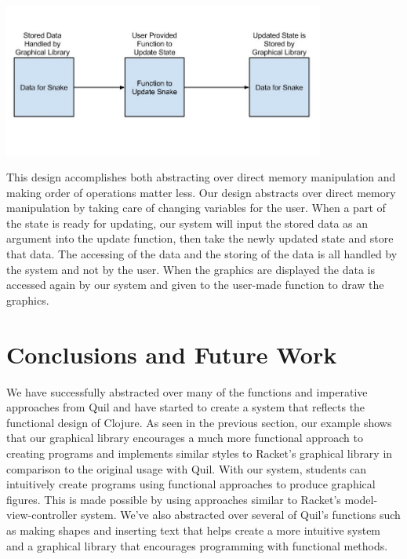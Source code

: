 \documentclass[12pt]{article}
\newcommand{\comment}[1]{}
\newcommand{\emcomment}[1]{\textcolor{ForestGreen}{\comment{Elena: {#1}}}}
\begin{document}
\begin{center}
\includegraphics[width=300pt]{Handling_State_in_Graphical_Library}
\end{center}
 
This design accomplishes both abstracting over direct memory manipulation and making order of operations matter less. Our design abstracts over direct memory manipulation by taking care of changing variables for the user. When a part of the state is ready for updating, our system will input the stored data as an argument into the update function, then take the newly updated state and store that data. The accessing of the data and the storing of the data is all handled by the system and not by the user. When the graphics are displayed the data is accessed again by our system and given to the user-made function to draw the graphics.

\section{Conclusions and Future Work}\label{sec:future-work}
We have successfully abstracted over many of the functions and imperative approaches from Quil and have started to create a system that reflects the functional design of Clojure. As seen in the previous section, our example shows that our graphical library encourages a much more functional approach to creating programs and implements similar styles to Racket's graphical library in comparison to the original usage with Quil. With our system, students can intuitively create programs using functional approaches to produce graphical figures. This is made possible by using approaches similar to Racket's model-view-controller system. We've also abstracted over several of Quil's functions such as making shapes and inserting text that helps create a more intuitive system and a graphical library that encourages programming with functional methods.%
\end{document}
